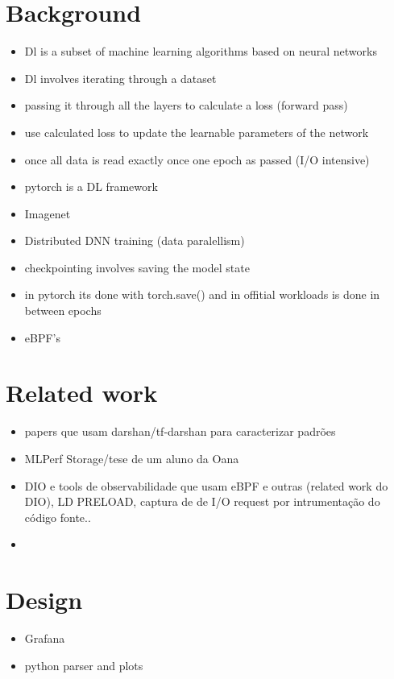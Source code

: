 \documentclass[conference]{IEEEtran}
\begin{document}
\section{Background}

\begin{itemize}
    \item Dl is a subset of machine learning algorithms based on neural networks
    \item Dl involves iterating through a dataset
    \item passing it through all the layers to calculate a loss (forward pass)
    \item use calculated loss to update the learnable parameters of the network
    \item once all data is read exactly once one epoch as passed (I/O intensive)
    \item pytorch is a DL framework
    \item Imagenet
    \item Distributed DNN training (data paralellism)
    \item checkpointing involves saving the model state
    \item in pytorch its done with torch.save() and in offitial workloads is done in between epochs
    \item eBPF's
\end{itemize}

\section{Related work}

\begin{itemize}
    \item papers que usam darshan/tf-darshan para caracterizar padrões
    \item MLPerf Storage/tese de um aluno da Oana
    \item DIO e tools de observabilidade que usam eBPF e outras (related work do DIO), LD PRELOAD, captura de de I/O request por intrumentação do código fonte..
    \item 
\end{itemize}

\section{Design}

\begin{itemize}
    \item Grafana
    \item python parser and plots
\end{itemize}
\end{document}
